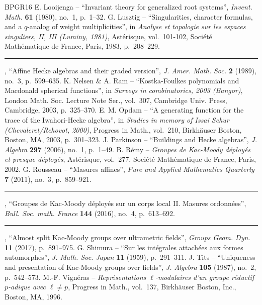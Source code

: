 \documentclass[11pt]{article}
\theoremstyle{definition}
\theoremstyle{remark}
\numberwithin{equation}{section}
\begin{document}
\begin{thebibliography}{BPGR16}
 E. Looijenga -- ``Invariant theory for generalized root systems'', \emph{Invent. Math.} \textbf{61} (1980), no.~1, p.~1--32.
 G. Lusztig -- ``Singularities, character formulas, and a $q$-analog of weight multiplicities'', in \emph{Analyse et topologie sur les espaces singuliers, II, III (Luminy, 1981)}, Astérisque, vol.~101-102, Société Mathématique de France, Paris, 1983, p.~208--229.
 \rule{1.2em}{0.1pt}, ``Affine Hecke algebras and their graded version'', \emph{J. Amer. Math. Soc.} \textbf{2} (1989), no.~3, p.~599--635.
 K. Nelsen \& A. Ram -- ``Kostka-Foulkes polynomials and Macdonald spherical functions'', in \emph{Surveys in combinatorics, 2003 (Bangor)}, London Math. Soc. Lecture Note Ser., vol.~307, Cambridge Univ. Press, Cambridge, 2003, p.~325--370.
 E. M. Opdam -- ``A generating function for the trace of the Iwahori-Hecke algebra'', in \emph{Studies in memory of Issai Schur (Chevaleret/Rehovot, 2000)}, Progress in Math., vol.~210, Birkhäuser Boston, Boston, MA, 2003, p.~301--323.
 J. Parkinson -- ``Buildings and Hecke algebras'', \emph{J. Algebra} \textbf{297} (2006), no.~1, p.~1--49.
 B. Rémy -- \emph{Groupes de Kac-Moody déployés et presque déployés}, Astérisque, vol.~277, Société Mathématique de France, Paris, 2002.
 G. Rousseau -- ``Masures affines'', \emph{Pure and Applied Mathematics Quarterly} \textbf{7} (2011), no.~3, p.~859--921.
 \rule{1.2em}{0.1pt}, ``Groupes de Kac-Moody déployés sur un corps local II. Masures ordonnées'', \emph{Bull. Soc. math. France} \textbf{144} (2016), no.~4, p.~613--692.
 \rule{1.2em}{0.1pt}, ``Almost split Kac-Moody groups over ultrametric fields'', \emph{Groups Geom. Dyn.} \textbf{11} (2017), p.~891--975.
 G. Shimura -- ``Sur les intégrales attachées aux formes automorphes'', \emph{J. Math. Soc. Japan} \textbf{11} (1959), p.~291--311.
 J. Tits -- ``Uniqueness and presentation of Kac-Moody groups over fields'', \emph{J. Algebra} \textbf{105} (1987), no.~2, p.~542--573.
 M.-F. Vignéras -- \emph{Représentations $\ell$-modulaires d'un groupe réductif $p$-adique avec $\ell\neq p$}, Progress in Math., vol.~137, Birkhäuser Boston, Inc., Boston, MA, 1996.
\end{thebibliography}
\end{document}
